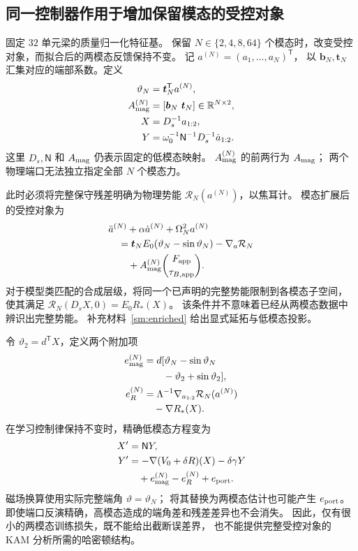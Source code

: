 \subsection{同一控制器作用于增加保留模态的受控对象}
\label{app:full-model}
固定 $32$ 单元梁的质量归一化特征基。
保留 $N\in\{2,4,8,64\}$ 个模态时，改变受控对象，而拟合后的两模态反馈保持不变。
记 $a^{(N)}=(a_1,\ldots,a_N)^{\mathsf T}$，
以 $\boldsymbol b_N,\boldsymbol t_N$ 汇集对应的端部系数。定义
\begin{align}
 \vartheta_N&=\boldsymbol t_N^{\mathsf T}a^{(N)},\nonumber\\
 A_{\rm mag}^{(N)}&=[\boldsymbol b_N\ \boldsymbol t_N]
                         \in\mathbb R^{N\times2},\nonumber\\
 X&=D_s^{-1}a_{1:2},\nonumber\\
 Y&=\omega_0^{-1}\mathsf N^{-1}D_s^{-1}\dot a_{1:2}.
 \label{app:enriched-coordinates}
\end{align}
这里 $D_s,\mathsf N$ 和 $A_{\rm mag}$ 仍表示固定的低模态映射。
$A_{\rm mag}^{(N)}$ 的前两行为 $A_{\rm mag}$；
两个物理端口无法独立指定全部 $N$ 个模态力。

此时必须将完整保守残差明确为物理势能 $\mathcal R_N(a^{(N)})$，以焦耳计。
模态扩展后的受控对象为
\begin{align}
 &\ddot a^{(N)}+\alpha\dot a^{(N)}+\Omega_N^2a^{(N)}\nonumber\\
 &\quad=\boldsymbol t_NE_0(\vartheta_N-\sin\vartheta_N)
       -\nabla_a\mathcal R_N\nonumber\\
 &\qquad+A_{\rm mag}^{(N)}\binom{F_{\rm app}}{\tau_{B,\rm app}}.
 \label{app:enriched-plant}
\end{align}
对于模型类匹配的合成层级，将同一个已声明的完整势能限制到各模态子空间，
使其满足 $\mathcal R_N(D_sX,0)=E_0R_*(X)$。
该条件并不意味着已经从两模态数据中辨识出完整势能。
补充材料~\ref{sm:enriched} 给出显式延拓与低模态投影。

令 $\vartheta_2=d^{\mathsf T}X$，定义两个附加项
\begin{align}
 e_{\rm mag}^{(N)}
 &=d[\vartheta_N-\sin\vartheta_N\nonumber\\
 &\qquad-\vartheta_2+\sin\vartheta_2],\nonumber\\
 e_R^{(N)}
 &=\Lambda^{-1}\nabla_{a_{1:2}}\mathcal R_N(a^{(N)})\nonumber\\
 &\quad-\nabla R_*(X).
 \label{app:enriched-defects}
\end{align}
在学习控制律保持不变时，精确低模态方程变为
\begin{align}
 X'&=\mathsf N Y,\nonumber\\
 Y'&=-\nabla(V_0+\delta R)(X)-\delta\gamma Y\nonumber\\
   &\quad+e_{\rm mag}^{(N)}-e_R^{(N)}+e_{\rm port}.
 \label{app:enriched-closed-loop}
\end{align}
磁场换算使用实际完整端角 $\vartheta=\vartheta_N$；
将其替换为两模态估计也可能产生 $e_{\rm port}$。
即使端口反演精确，高模态造成的端角差和残差差异也不会消失。
因此，仅有很小的两模态训练损失，既不能给出截断误差界，
也不能提供完整受控对象的 KAM 分析所需的哈密顿结构。

